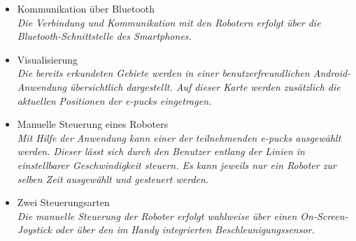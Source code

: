 \documentclass[10pt,a4paper]{article}
\begin{document}
\begin{itemize}
				\begin{itemize}
					\item Kommunikation über Bluetooth
						\\ \textsl{Die Verbindung und Kommunikation mit den Robotern erfolgt über die Bluetooth-Schnittstelle des
							Smartphones.}
					\item Visualisierung
						\\ \textsl{Die bereits erkundeten Gebiete werden in einer benutzerfreundlichen Android-Anwendung übersichtlich
							dargestellt. Auf dieser Karte werden zusätzlich die aktuellen Positionen der e-pucks eingetragen.}
					\item Manuelle Steuerung eines Roboters
						\\ \textsl{Mit Hilfe der Anwendung kann einer der teilnehmenden e-pucks ausgewählt werden. Dieser lässt sich
							durch den Benutzer entlang der Linien in einstellbarer Geschwindigkeit steuern. Es kann jeweils nur ein Roboter
							zur selben Zeit ausgewählt und gesteuert werden.}		
					\item Zwei Steuerungsarten
						\\ \textsl{Die manuelle Steuerung der Roboter erfolgt wahlweise über einen On-Screen-Joystick oder über
							den im Handy integrierten Beschleunigungssensor.}											
				\end{itemize}
			\end{itemize}
\end{document}
